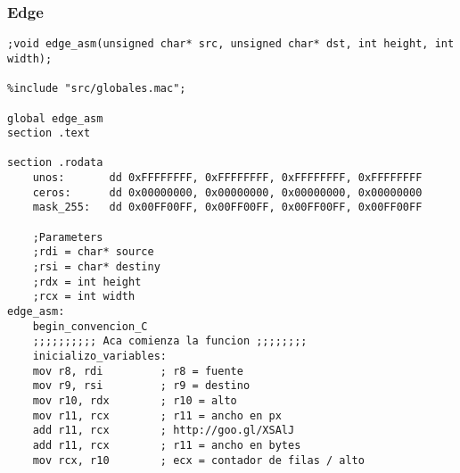 \subsubsection{Edge}
\begin{verbatim}
;void edge_asm(unsigned char* src, unsigned char* dst, int height, int width);

%include "src/globales.mac";

global edge_asm
section .text

section .rodata
    unos:       dd 0xFFFFFFFF, 0xFFFFFFFF, 0xFFFFFFFF, 0xFFFFFFFF
    ceros:      dd 0x00000000, 0x00000000, 0x00000000, 0x00000000
    mask_255:   dd 0x00FF00FF, 0x00FF00FF, 0x00FF00FF, 0x00FF00FF

    ;Parameters
    ;rdi = char* source
    ;rsi = char* destiny
    ;rdx = int height
    ;rcx = int width
edge_asm:
    begin_convencion_C
	;;;;;;;;;; Aca comienza la funcion ;;;;;;;;
    inicializo_variables:
    mov r8, rdi         ; r8 = fuente
    mov r9, rsi         ; r9 = destino
    mov r10, rdx        ; r10 = alto
    mov r11, rcx        ; r11 = ancho en px
    add r11, rcx        ; http://goo.gl/XSAlJ
    add r11, rcx        ; r11 = ancho en bytes
    mov rcx, r10        ; ecx = contador de filas / alto


\end{verbatim}

